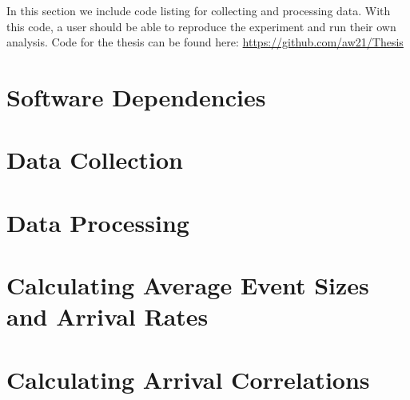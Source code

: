 In this section we include code listing for collecting and processing data. With this code, a user should be able to reproduce the experiment and run their own analysis. Code for the thesis can be found here: \url{https://github.com/aw21/Thesis}

\section{Software Dependencies}
\begin{singlespacing}

\end{singlespacing}

\section{Data Collection}
\begin{singlespacing}
\label{data-collection-code}
\end{singlespacing}

\section{Data Processing}
\begin{singlespacing}
\label{data-processing-code}
\end{singlespacing}

\section{Calculating Average Event Sizes and Arrival Rates}
\begin{singlespacing}
\label{AES_and_rate_code}
\end{singlespacing}

\section{Calculating Arrival Correlations}
\begin{singlespacing}
\label{correlation-code}
\end{singlespacing}

